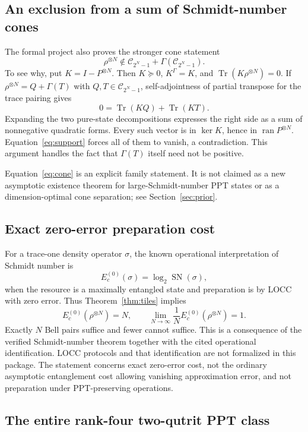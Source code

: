 \documentclass[11pt]{article}
\theoremstyle{definition}
\newcommand{\tr}{\operatorname{Tr}}
\newcommand{\SN}{\operatorname{SN}}
\newcommand{\ran}{\operatorname{ran}}
\begin{document}
\subsection{An exclusion from a sum of Schmidt-number cones}

The formal project also proves the stronger cone statement
\begin{equation}\label{eq:cone}
 \rho^{\otimes N}\notin
 \mathcal C_{2^N-1}+\Gamma(\mathcal C_{2^N-1}).
\end{equation}
To see why, put $K=I-P^{\otimes N}$. Then $K\succeq0$, $K^\Gamma=K$, and
$\tr(K\rho^{\otimes N})=0$. If $\rho^{\otimes N}=Q+\Gamma(T)$ with
$Q,T\in\mathcal C_{2^N-1}$, self-adjointness of partial transpose for the
trace pairing gives
\[
 0=\tr(KQ)+\tr(KT).
\]
Expanding the two pure-state decompositions expresses the right side as a
sum of nonnegative quadratic forms. Every such vector is in $\ker K$, hence
in $\ran P^{\otimes N}$. Equation~\eqref{eq:support} forces all of them to
vanish, a contradiction. This argument handles the fact that $\Gamma(T)$
itself need not be positive.

Equation~\eqref{eq:cone} is an explicit family statement. It is not claimed
as a new asymptotic existence theorem for large-Schmidt-number PPT states
or as a dimension-optimal cone separation; see Section~\ref{sec:prior}.

\subsection{Exact zero-error preparation cost}

For a trace-one density operator $\sigma$, the known operational
interpretation of Schmidt number is \cite{terhal2000,yue2019}
\[
 E_c^{(0)}(\sigma)=\log_2\SN(\sigma),
\]
when the resource is a maximally entangled state and preparation is by LOCC
with zero error. Thus Theorem~\ref{thm:tiles} implies
\[
 E_c^{(0)}(\rho^{\otimes N})=N,
 \qquad \lim_{N\to\infty}\frac1N E_c^{(0)}(\rho^{\otimes N})=1.
\]
Exactly $N$ Bell pairs suffice and fewer cannot suffice. This is a consequence
of the verified Schmidt-number theorem together with the cited operational
identification. LOCC protocols and that identification are not formalized in
this package. The statement concerns exact zero-error cost, not the ordinary
asymptotic entanglement cost allowing vanishing approximation error, and not
preparation under PPT-preserving operations.

\subsection{The entire rank-four two-qutrit PPT class}
\end{document}
